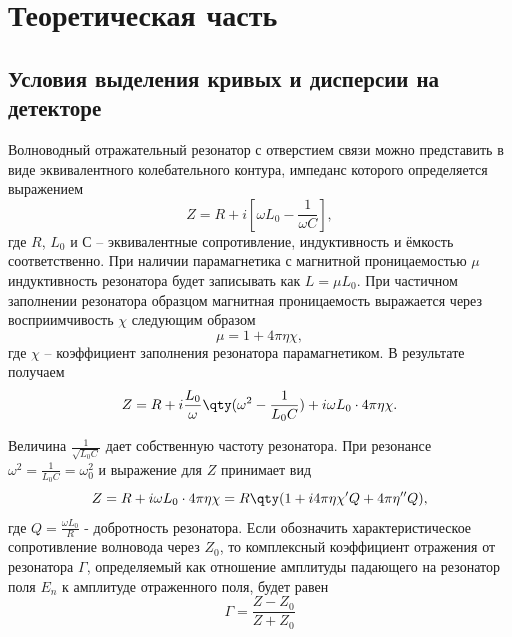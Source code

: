 

\def\labauthors{Виноградов И.Д., Понур К.А., Шиков А.П.}
\def\labgroup{440}
\def\labnumber{1}
\def\labtheme{Исследование твердотельных структур методом ЭПР-спектроскопии}
\def\department{Кафедра квантовой радиофизики и электроники}

\newpage
\section{Теоретическая часть}%
\subsection{Условия выделения кривых и дисперсии на детекторе}%


Волноводный отражательный резонатор с отверстием связи можно представить в виде эквивалентного колебательного контура, импеданс которого определяется выражением
\begin{equation}
    \label{eq:1}
    Z = R + i [ \omega L_{0} - \frac{1}{\omega C}],
\end{equation}
где $R$, $L_{0}$ и $С$ -- эквивалентные сопротивление, индуктивность и ёмкость соответственно. При наличии парамагнетика с магнитной проницаемостью  $\mu$ индуктивность резонатора будет записывать как $L = \mu L_{0}$. При частичном заполнении резонатора образцом магнитная проницаемость выражается через восприимчивость $\chi$ следующим образом
\begin{equation}
    \label{eq:2}
    \mu = 1 + 4 \pi \eta \chi,
\end{equation}
где $\chi$ -- коэффициент заполнения резонатора парамагнетиком. В результате получаем
\begin{equation}
    \label{eq:3}
    Z = R + i \frac{L_{0}}{\omega} \qty( \omega^{2} - \frac{1}{L_{0}C}) + i \omega L_{0} \cdot 4 \pi \eta \chi.
\end{equation} 

Величина $\frac{1}{\sqrt{L_{0} C}}$ дает собственную частоту резонатора. При резонансе $\omega^2 = \frac{1}{L_{0}C} = \omega^2_0$ и выражение для $Z$ принимает вид
\begin{equation}
    \label{eq:4}
    Z = R + i \omega L_{0} \cdot 4 \pi \eta \chi = R \qty( 1 + i 4 \pi \eta \chi' Q + 4 \pi \eta'' Q),
\end{equation}
где $Q = \frac{\omega L_0}{R}$ - добротность резонатора. Если обозначить характеристическое сопротивление волновода через $Z_0$, то комплексный коэффициент отражения от резонатора  $\Gamma$, определяемый как отношение амплитуды падающего на резонатор поля  $E_n$ к амплитуде отраженного поля, будет равен
 \begin{equation}
    \label{eq:5}
    \Gamma = \frac{Z-Z_{0}}{Z+Z_{0}}
\end{equation}

